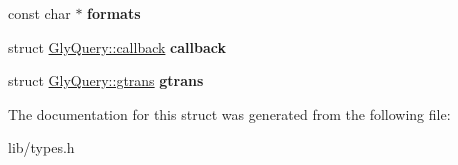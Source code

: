 \begin{DoxyCompactItemize}
\item 
\hypertarget{structGlyQuery_a7075504c58cd3a672441165624c19cbe}{
const char $\ast$ {\bfseries formats}}
\label{structGlyQuery_a7075504c58cd3a672441165624c19cbe}

\item 
\hypertarget{structGlyQuery_ad131e9235a5e0cb5e0ceb0add2f64775}{
struct \hyperlink{structGlyQuery_1_1callback}{GlyQuery::callback} {\bfseries callback}}
\label{structGlyQuery_ad131e9235a5e0cb5e0ceb0add2f64775}

\item 
\hypertarget{structGlyQuery_af6d442c75fe451f19c3d03482a9e9844}{
struct \hyperlink{structGlyQuery_1_1gtrans}{GlyQuery::gtrans} {\bfseries gtrans}}
\label{structGlyQuery_af6d442c75fe451f19c3d03482a9e9844}

\end{DoxyCompactItemize}


The documentation for this struct was generated from the following file:\begin{DoxyCompactItemize}
\item 
lib/types.h\end{DoxyCompactItemize}
